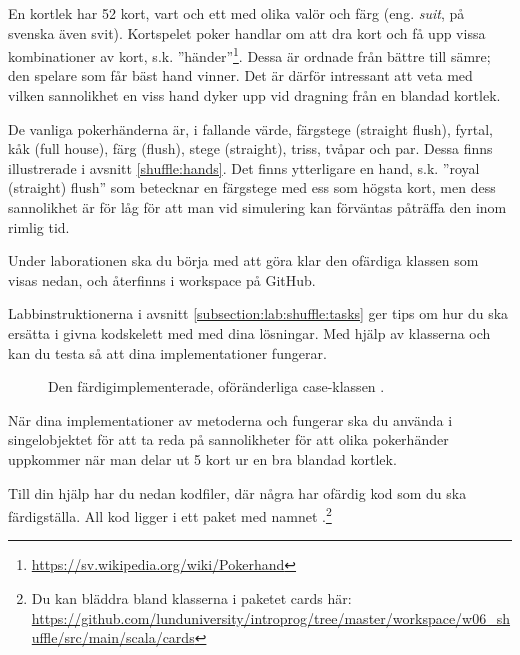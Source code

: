 En kortlek  har 52 kort, vart och ett med olika valör  och färg (eng. \emph{suit}, på svenska även svit). Kortspelet poker handlar om att dra kort och få upp vissa kombinationer av kort, s.k. ''händer''\footnote{\href{https://sv.wikipedia.org/wiki/Pokerhand}{https://sv.wikipedia.org/wiki/Pokerhand}}. Dessa är ordnade från bättre till sämre; den spelare som får bäst hand vinner.
Det är därför intressant att veta med vilken sannolikhet en viss hand dyker upp vid dragning från en blandad kortlek.

De vanliga pokerhänderna är, i fallande värde, färgstege (straight flush), fyrtal, kåk (full house), färg (flush), stege (straight), triss, tvåpar och par. Dessa finns illustrerade i avsnitt \ref{shuffle:hands}.
Det finns ytterligare en hand, s.k. ''royal (straight) flush'' som betecknar en färgstege med ess som högsta kort, men dess sannolikhet är för låg för att man vid simulering kan förväntas påträffa den inom rimlig tid.

Under laborationen ska du börja med att göra klar den ofärdiga klassen  som visas nedan, och återfinns i workspace på GitHub.



Labbinstruktionerna i avsnitt \ref{subsection:lab:shuffle:tasks} ger tips om hur du ska ersätta  i givna kodskelett med med dina lösningar.
Med hjälp av klasserna  och  kan du testa så att dina implementationer fungerar.

\begin{figure}
\caption{Den färdigimplementerade, oföränderliga case-klassen .}
\label{shuffle:fig-card}
\end{figure}




När dina implementationer av metoderna  och  fungerar ska du använda  i singelobjektet  för att ta reda på sannolikheter för att olika pokerhänder uppkommer när man delar ut 5 kort ur en bra blandad kortlek.

Till din hjälp har du nedan kodfiler, där några har ofärdig kod som du ska färdigställa. All kod  ligger i ett paket med namnet .\footnote{Du kan bläddra bland klasserna i paketet cards här: \\
\href{https://github.com/lunduniversity/introprog/tree/master/workspace/w06_shuffle/src/main/scala/cards}{\mbox{\fontsize{9}{11}\selectfont  https://github.com/lunduniversity/introprog/tree/master/workspace/w06\_shuffle/src/main/scala/cards}}}

